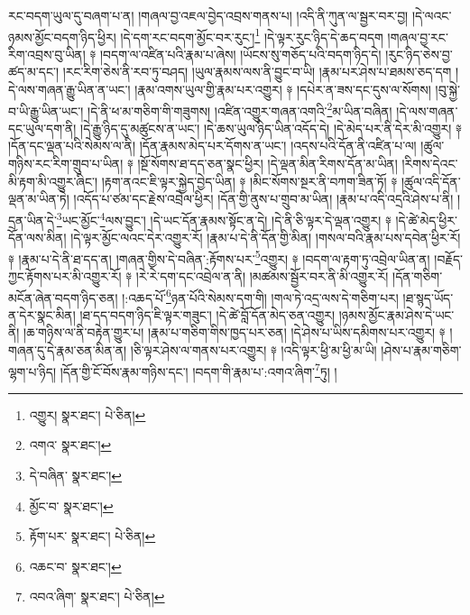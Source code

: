 རང་བདག་ཡུལ་དུ་བཞག་པ་ན། །གཞལ་བྱ་འཇལ་བྱེད་འབྲས་གནས་པ། །འདི་ནི་ཀུན་ལ་སྦྱར་བར་བྱ། །དེ་ལའང་ཉམས་མྱོང་བདག་ཉིད་ཕྱིར། །དེ་དག་རང་བདག་མྱོང་བར་རུང་།\footnote{འགྱུར།  སྣར་ཐང་།  པེ་ཅིན། } །དེ་ལྟར་རུང་ཉིད་དེ་ཆད་བདག །གཞལ་བྱ་རང་རིག་འབྲས་བུ་ཡིན། ༈ །བདག་ལ་འཛིན་པའི་རྣམ་པ་ཞེས། །ཡོངས་སུ་གཅོད་པའི་བདག་ཉིད་དེ། །རུང་ཉིད་ཅེས་བྱ་ཚད་མ་དང་། །རང་རིག་ཅེས་ནི་རབ་ཏུ་བཤད། །ཡུལ་རྣམས་ལས་ནི་བྱུང་བ་ཡི། །རྣམ་པར་ཤེས་པ་ཐམས་ཅད་དག །དེ་ལས་གཞན་རྒྱུ་ཡིན་ན་ཡང་། །རྣམ་འགས་ཡུལ་གྱི་རྣམ་པར་འགྱུར། ༈ །དཔེར་ན་ཟས་དང་དུས་ལ་སོགས། །བུ་སྐྱེ་བ་ཡི་རྒྱུ་ཡིན་ཡང་། །དེ་ནི་ཕ་མ་གཅིག་གི་གཟུགས། །འཛིན་འགྱུར་གཞན་འགའི་\footnote{འགའ་  སྣར་ཐང་། }མ་ཡིན་བཞིན། །དེ་ལས་གཞན་དང་ཡུལ་དག་ནི། །དེ་རྒྱུ་ཉིད་དུ་མཚུངས་ན་ཡང་། །དེ་ཆས་ཡུལ་ཉིད་ཡིན་འདོད་དེ། །དེ་མེད་པར་ནི་དེར་མི་འགྱུར། ༈ །དོན་དང་ལྡན་པའི་སེམས་ལ་ནི། །དོན་རྣམས་མེད་པར་དོགས་ན་ཡང་། །འདས་པའི་དོན་ནི་འཛིན་པ་ལ། །ཚུལ་གཉིས་རང་རིག་གྲུབ་པ་ཡིན། ༈ །སྔོ་སོགས་ཐ་དད་ཅན་སྣང་ཕྱིར། །དེ་ལྡན་མིན་རིགས་དོན་མ་ཡིན། །རིགས་དེའང་མི་རྟག་མི་འགྱུར་ཞིང་། །རྟག་ནའང་ཇི་ལྟར་སྐྱེད་བྱེད་ཡིན། ༈ །མིང་སོགས་སྔར་ནི་བཀག་ཟིན་ཏོ། ༈ །ཚུལ་འདི་དོན་ལྡན་མ་ཡིན་ཏེ། །འདོད་པ་ཙམ་དང་རྗེས་འབྲེལ་ཕྱིར། །དོན་གྱི་ནུས་པ་གྲུབ་མ་ཡིན། །རྣམ་པ་འདི་འདྲའི་ཤེས་པ་ནི། །དྲན་ཡིན་དེ་\footnote{དེ་བཞིན་  སྣར་ཐང་། }ཡང་མྱོང་\footnote{མྱོང་བ་  སྣར་ཐང་། }ལས་བྱུང་། །དེ་ཡང་དོན་རྣམས་སྟོང་ན་དེ། །དེ་ནི་ཅི་ལྟར་དེ་ལྡན་འགྱུར། ༈ །དེ་ཚེ་མེད་ཕྱིར་དོན་ལས་མིན། །དེ་ལྟར་མྱོང་ལའང་དེར་འགྱུར་རོ། །རྣམ་པ་དེ་ནི་དོན་གྱི་མིན། །གསལ་བའི་རྣམ་པས་དབེན་ཕྱིར་རོ། ༈ །རྣམ་པ་དེ་ནི་ཐ་དད་ན། །གཞན་གྱིས་དེ་བཞིན་:རྟོགས་པར་\footnote{རྟོག་པར་  སྣར་ཐང་།  པེ་ཅིན། }འགྱུར། ༈ །བདག་ལ་རྟག་ཏུ་འབྲེལ་ཡིན་ན། །བརྗོད་ཀྱང་རྟོགས་པར་མི་འགྱུར་རོ། ༈ །རེ་རེ་དག་དང་འབྲེལ་ན་ནི། །མཚམས་སྦྱོར་བར་ནི་མི་འགྱུར་རོ། །དོན་གཅིག་མངོན་ཞེན་བདག་ཉིད་ཅན། །:འཆད་པོ་\footnote{འཆང་བ་  སྣར་ཐང་། }ཉན་པོའི་སེམས་དག་གི། །གལ་ཏེ་འདྲ་ལས་དེ་གཅིག་པར། །ཐ་སྙད་ཡོད་ན་དེར་སྣང་མིན། །ཐ་དད་བདག་ཉིད་ཇི་ལྟར་གཟུང་། །དེ་ཚེ་བློ་དོན་མེད་ཅན་འགྱུར། །ཉམས་མྱོང་རྣམ་ཤེས་དེ་ཡང་ནི། །ཆ་གཉིས་ལ་ནི་བརྟེན་གྱུར་པ། །རྣམ་པ་གཅིག་གིས་ཁྱད་པར་ཅན། །དེ་ཤེས་པ་ཡིས་དམིགས་པར་འགྱུར། ༈ །གཞན་དུ་དེ་རྣམ་ཅན་མིན་ན། །ཅི་ལྟར་ཤེས་ལ་གནས་པར་འགྱུར། ༈ །འདི་ལྟར་ཕྱི་མ་ཕྱི་མ་ཡི། །ཤེས་པ་རྣམ་གཅིག་ལྷག་པ་ཉིད། །དོན་གྱི་ངོ་བོས་རྣམ་གཉིས་དང་། །བདག་གི་རྣམ་པ་:འགའ་ཞིག་\footnote{འབའ་ཞིག་  སྣར་ཐང་།  པེ་ཅིན། }ཏུ། །
